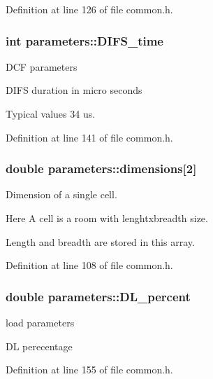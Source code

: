 Definition at line 126 of file common.\-h.

\hypertarget{structparameters_adca3efd3a896aefccc975ebb57e71423}{
\subsubsection[{D\-I\-F\-S\-\_\-time}]{\setlength{\rightskip}{0pt plus 5cm}int parameters\-::\-D\-I\-F\-S\-\_\-time}}\label{structparameters_adca3efd3a896aefccc975ebb57e71423}
D\-C\-F parameters \par
D\-I\-F\-S duration in micro seconds \par
Typical values 34 us. \par


Definition at line 141 of file common.\-h.

\hypertarget{structparameters_a67043e8064b2352cadfb685b1f39f66b}{
\subsubsection[{dimensions}]{\setlength{\rightskip}{0pt plus 5cm}double parameters\-::dimensions\mbox{[}2\mbox{]}}}\label{structparameters_a67043e8064b2352cadfb685b1f39f66b}
Dimension of a single cell. \par
Here A cell is a room with lenghtxbreadth size. \par
Length and breadth are stored in this array. \par


Definition at line 108 of file common.\-h.

\hypertarget{structparameters_aedef612155015dc5d8dad50414bac5ac}{
\subsubsection[{D\-L\-\_\-percent}]{\setlength{\rightskip}{0pt plus 5cm}double parameters\-::\-D\-L\-\_\-percent}}\label{structparameters_aedef612155015dc5d8dad50414bac5ac}
load parameters \par
D\-L perecentage \par


Definition at line 155 of file common.\-h.

